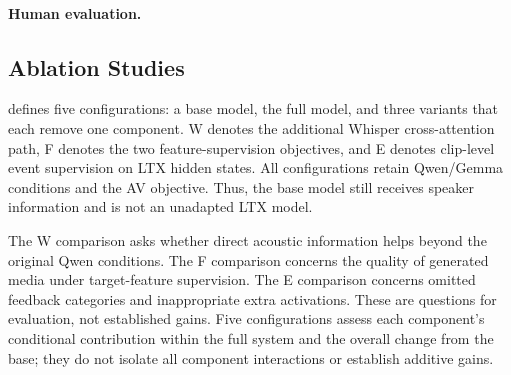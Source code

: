 \paragraph{Human evaluation.}


\subsection{Ablation Studies}
\label{sec:ablation}
 defines five configurations: a base model, the full model, and three variants that each remove one component. W denotes the additional Whisper cross-attention path, F denotes the two feature-supervision objectives, and E denotes clip-level event supervision on LTX hidden states. All configurations retain Qwen/Gemma conditions and the AV objective. Thus, the base model still receives speaker information and is not an unadapted LTX model.

The W comparison asks whether direct acoustic information helps beyond the original Qwen conditions. The F comparison concerns the quality of generated media under target-feature supervision. The E comparison concerns omitted feedback categories and inappropriate extra activations. These are questions for evaluation, not established gains. Five configurations assess each component's conditional contribution within the full system and the overall change from the base; they do not isolate all component interactions or establish additive gains.



